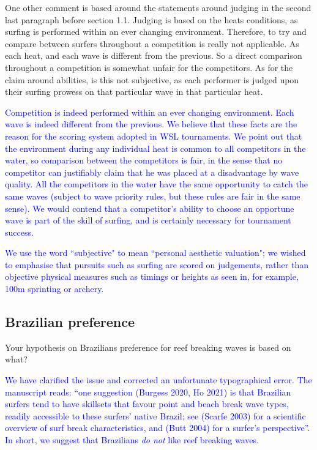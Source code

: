 \documentclass[12pt]{article}
\begin{document}
One other comment is based around the statements around judging in the
second last paragraph before section 1.1. Judging is based on the
heats conditions, as surfing is performed within an ever changing
environment. Therefore, to try and compare between surfers throughout
a competition is really not applicable. As each heat, and each wave is
different from the previous. So a direct comparison throughout a
competition is somewhat unfair for the competitors. As for the claim
around abilities, is this not subjective, as each performer is judged
upon their surfing prowess on that particular wave in that particular
heat.


\textcolor{blue}{Competition is indeed performed within an ever
  changing environment.  Each wave is indeed different from the
  previous.  We believe that these facts are the reason for the
  scoring system adopted in WSL tournaments.  We point out that the
  environment during any individual heat is common to all competitors
  in the water, so comparison between the competitors is fair, in the
  sense that no competitor can justifiably claim that he was placed at
  a disadvantage by wave quality.  All the competitors in the water
  have the same opportunity to catch the same waves (subject to wave
  priority rules, but these rules are fair in the same sense).  We
  would contend that a competitor's ability to choose an opportune
  wave is part of the skill of surfing, and is certainly necessary for
  tournament success.}

\textcolor{blue}{We use the word ``subjective" to mean ``personal
  aesthetic valuation"; we wished to emphasise that pursuits such as
  surfing are scored on judgements, rather than objective physical
  measures such as timings or heights as seen in, for example, 100m
  sprinting or archery.}
  


\subsection*{Brazilian preference}


Your hypothesis on Brazilians preference for reef breaking waves is
based on what?


\textcolor{blue}{We have clarified the issue and corrected an
  unfortunate typographical error.  The manuscript reads: ``one
  suggestion (Burgess 2020, Ho 2021) is that Brazilian surfers tend to
  have skillsets that favour point and beach break wave types, readily
  accessible to these surfers' native Brazil; see (Scarfe 2003) for a
  scientific overview of surf break characteristics, and (Butt 2004)
  for a surfer's perspective''.  In short, we suggest that Brazilians
  {\em do not} like reef breaking waves.}
\end{document}
